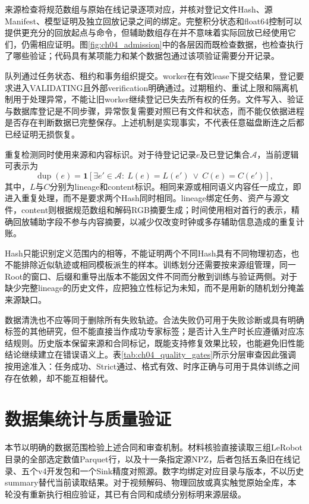 来源检查将规范数组与原始在线记录逐项对应，并核对登记文件Hash、源Manifest、模型证明及独立回放记录之间的绑定。完整积分状态和float64控制可以提供更充分的回放起点与命令，但辅助数组存在并不意味着实际回放已经使用它们，仍需相应证明。图\ref{fig:ch04_admission}中的各层因而既检查数据，也检查执行了哪些验证；代码具有某项能力和某个数据包通过该项验证需要分开记录。

队列通过任务状态、租约和事务组织提交。worker在有效lease下提交结果，登记要求进入VALIDATING且外部verification明确通过。过期租约、重试上限和隔离机制用于处理异常，不能让旧worker继续登记已失去所有权的任务。文件写入、验证与数据库登记是不同步骤，异常恢复需要对照已有文件和状态，而不能仅依据进程是否存在判断数据已完整保存。上述机制是实现事实，不代表任意磁盘断连之后都已经证明无损恢复。

重复检测同时使用来源和内容标识。对于待登记记录$e$及已登记集合$\mathcal A$，当前逻辑可表示为
\begin{equation}
 \operatorname{dup}(e)=\boldsymbol 1\!\left[
 \exists e'\in\mathcal A:\ L(e)=L(e')\ \lor\ C(e)=C(e')\right],
 \label{eq:ch04_duplicate}
\end{equation}
其中，$L$与$C$分别为lineage和content标识。相同来源或相同语义内容任一成立，即进入重复处理，而不是要求两个Hash同时相同。lineage绑定任务、资产与源文件，content则根据规范数组和解码RGB摘要生成；时间使用相对首行的表示，精确回放辅助字段不参与内容摘要，以减少仅改变时钟或多存辅助信息造成的重复计账。

Hash只能识别定义范围内的相等，不能证明两个不同Hash具有不同物理初态，也不能排除近似轨迹或相同模板派生的样本。训练划分还需要按来源组管理，同一Root的窗口、后缀和重导出版本不能因文件不同而分散到训练与验证两侧。对于缺少完整lineage的历史文件，应把独立性标记为未知，而不是用新的随机划分掩盖来源缺口。

数据清洗也不应等同于删除所有失败轨迹。合法失败仍可用于失败诊断或具有明确标签的其他研究，但不能直接当作成功专家标签；是否计入生产时长应遵循对应冻结规则。历史版本保留来源和合同标记，既能支持修复效果比较，也能避免旧性能结论继续建立在错误语义上。表\ref{tab:ch04_quality_gates}所示分层审查因此强调按用途准入：任务成功、Strict通过、格式有效、时序正确与可用于具体训练之间存在依赖，却不能互相替代。

\section{数据集统计与质量验证}
\label{sec:dataset_quality_validation}

本节以明确的数据范围检验上述合同和审查机制。材料核验直接读取三组LeRobot目录的全部选定数值Parquet行，以及十一条指定源NPZ，后者包括五条旧在线记录、五个v4开发包和一个Sink精度对照源。数字均绑定对应目录与版本，不以历史summary替代当前读取结果。对于视频解码、物理回放或真实触觉原始全库，本轮没有重新执行相应验证，其已有合同和成绩分别标明来源层级。

